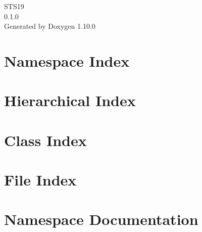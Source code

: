 \documentclass[twoside]{book}
\newcommand{\+}{\discretionary{\mbox{\scriptsize$\hookleftarrow$}}{}{}}
\newcommand{\clearemptydoublepage}{%
    \newpage{\pagestyle{empty}\cleardoublepage}%
  }
\begin{document}
  \raggedbottom
    \hypersetup{pageanchor=false,
                bookmarksnumbered=true,
                pdfencoding=unicode
               }
  \begin{titlepage}
  \vspace*{7cm}
  \begin{center}%
  {\Large STS19}\\
  [1ex]\large 0.\+1.\+0 \\
  \vspace*{1cm}
  {\large Generated by Doxygen 1.10.0}\\
  \end{center}
  \end{titlepage}
  \clearemptydoublepage
  \tableofcontents
  \clearemptydoublepage
  \hypersetup{pageanchor=true}


\chapter{Namespace Index}

\chapter{Hierarchical Index}

\chapter{Class Index}

\chapter{File Index}

\chapter{Namespace Documentation}














\end{document}
